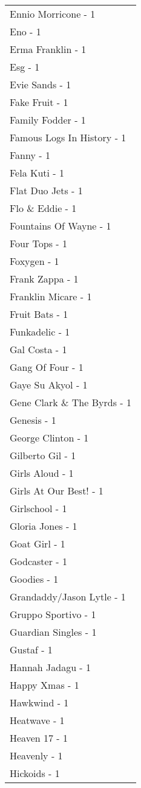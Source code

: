 \documentclass[
]{article}
\begin{document}
\begin{longtable}{l}
Ennio Morricone - 1 \\ 
Eno - 1 \\ 
Erma Franklin - 1 \\ 
Esg - 1 \\ 
Evie Sands - 1 \\ 
Fake Fruit - 1 \\ 
Family Fodder - 1 \\ 
Famous Logs In History - 1 \\ 
Fanny - 1 \\ 
Fela Kuti - 1 \\ 
Flat Duo Jets - 1 \\ 
Flo \& Eddie - 1 \\ 
Fountains Of Wayne - 1 \\ 
Four Tops - 1 \\ 
Foxygen - 1 \\ 
Frank Zappa - 1 \\ 
Franklin Micare - 1 \\ 
Fruit Bats - 1 \\ 
Funkadelic - 1 \\ 
Gal Costa - 1 \\ 
Gang Of Four - 1 \\ 
Gaye Su Akyol - 1 \\ 
Gene Clark \& The Byrds - 1 \\ 
Genesis - 1 \\ 
George Clinton - 1 \\ 
Gilberto Gil - 1 \\ 
Girls Aloud - 1 \\ 
Girls At Our Best! - 1 \\ 
Girlschool - 1 \\ 
Gloria Jones - 1 \\ 
Goat Girl - 1 \\ 
Godcaster - 1 \\ 
Goodies - 1 \\ 
Grandaddy/Jason Lytle - 1 \\ 
Gruppo Sportivo - 1 \\ 
Guardian Singles - 1 \\ 
Gustaf - 1 \\ 
Hannah Jadagu - 1 \\ 
Happy Xmas - 1 \\ 
Hawkwind - 1 \\ 
Heatwave - 1 \\ 
Heaven 17 - 1 \\ 
Heavenly - 1 \\ 
Hickoids - 1 \\ 

\end{longtable}
\end{document}

